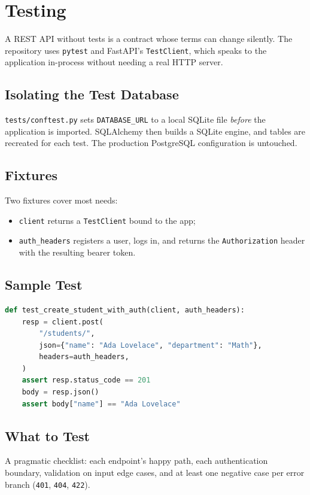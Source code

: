 \documentclass[11pt]{book}
\begin{document}
\chapter{Testing}
\label{ch:tests}

A REST API without tests is a contract whose terms can change silently.
The repository uses \texttt{pytest} and FastAPI's \texttt{TestClient},
which speaks to the application in-process without needing a real HTTP
server.

\section{Isolating the Test Database}
\texttt{tests/conftest.py} sets \texttt{DATABASE\_URL} to a local SQLite
file \emph{before} the application is imported. SQLAlchemy then builds a
SQLite engine, and tables are recreated for each test. The production
PostgreSQL configuration is untouched.

\section{Fixtures}
Two fixtures cover most needs:
\begin{itemize}[leftmargin=*]
  \item \texttt{client} returns a \texttt{TestClient} bound to the app;
  \item \texttt{auth\_headers} registers a user, logs in, and returns the
        \texttt{Authorization} header with the resulting bearer token.
\end{itemize}

\section{Sample Test}
\begin{lstlisting}[style=base, language=Python]
def test_create_student_with_auth(client, auth_headers):
    resp = client.post(
        "/students/",
        json={"name": "Ada Lovelace", "department": "Math"},
        headers=auth_headers,
    )
    assert resp.status_code == 201
    body = resp.json()
    assert body["name"] == "Ada Lovelace"
\end{lstlisting}

\section{What to Test}
A pragmatic checklist: each endpoint's happy path, each authentication
boundary, validation on input edge cases, and at least one negative case
per error branch (\texttt{401}, \texttt{404}, \texttt{422}).
\end{document}
